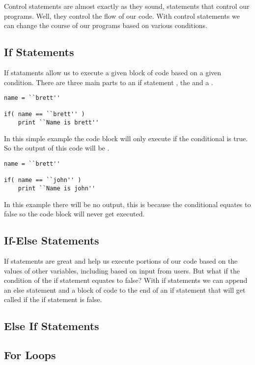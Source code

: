 Control statements are almost exactly as they sound, statements that control our programs.
Well, they control the flow of our code.
With control statements we can change the course of our programs based on various conditions.

\subsection{If Statements}
If stataments allow us to execute a given block of code based on a given condition.
There are three main parts to an if statement , the  and a .


\begin{lstlisting}[caption={If Statement}]
name = ``brett''

if( name == ``brett'' )
    print ``Name is brett''
\end{lstlisting}

In this simple example the code block  will only execute if the conditional  is true.
So the output of this code will be .

\begin{lstlisting}[caption={False If Statement}]
name = ``brett''

if( name == ``john'' )
    print ``Name is john''
\end{lstlisting}

In this example there will be no output, this is because the conditional  equates to false so the code block  will never get executed.

\subsection{If-Else Statements}
If statements are great and help us execute portions of our code based on the values of other variables, including based on input from users.
But what if the condition of the if statement equates to false?
With if statements we can append an else statement and a block of code to the end of an if statement that will get called if the if statement is false. 


\subsection{Else If Statements}

\subsection{For Loops}

